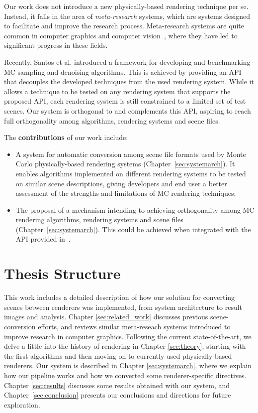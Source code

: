 Our work does not introduce a new physically-based rendering technique per se. Instead, it falls in the area of {\it meta-research} systems, which are systems 
designed to facilitate and improve the research process. Meta-research systems are quite common in computer graphics and computer vision~\cite{MiddleburyStereo, MiddleburyFlow, AlphaMatting, VideoMatting}, where they have led to significant progress in these fields. 
  
Recently, Santos et al. \cite{Santos:2018:FBKSD} introduced a framework for developing and benchmarking MC sampling and denoising algorithms. This is achieved by providing an API that decouples the developed techniques from the used rendering system. 
While it allows a technique to be tested on any rendering system that supports the proposed API, each rendering system is still constrained to a limited set of test scenes. Our system is orthogonal to and complements this API, aspiring to reach full orthogonality among algorithms, rendering systems and scene files.

The {\bf contributions} of our work include:
\begin{itemize}
	\item A system for automatic conversion among scene file formats used by Monte Carlo physically-based rendering systems (Chapter~\ref{sec:systemarch}).
	It enables algorithms implemented on different rendering systems to be tested on similar scene descriptions, giving developers and end user a better 
assessment of the strengths and limitations of MC rendering techniques;
	\item The proposal of a mechanism intending to achieving orthogonality among MC rendering algorithms, rendering systems and scene files (Chapter~\ref{sec:systemarch}). 
This could be achieved when integrated with the API provided in~\cite{Santos:2018:FBKSD}. 
\end{itemize}

\section{Thesis Structure}

This work includes a detailed description of how our solution for converting scenes between renderers was implemented, from system architecture to result images and analysis. Chapter \ref{sec:related_work} discusses previous scene-conversion efforts, and reviews 
similar meta-reseach systems introduced to improve research in computer graphics.
Following the current state-of-the-art, we delve a little into the history of rendering in Chapter \ref{sec:theory}, starting with the first algorithms and then moving on to currently used physically-based renderers.
%
Our system is described in Chapter \ref{sec:systemarch}, where we explain how our pipeline works and how we converted some renderer-specific directives. Chapter \ref{sec:results} discusses some results obtained with our system, and  Chapter~\ref{sec:conclusion} presents our conclusions and directions for future exploration.


